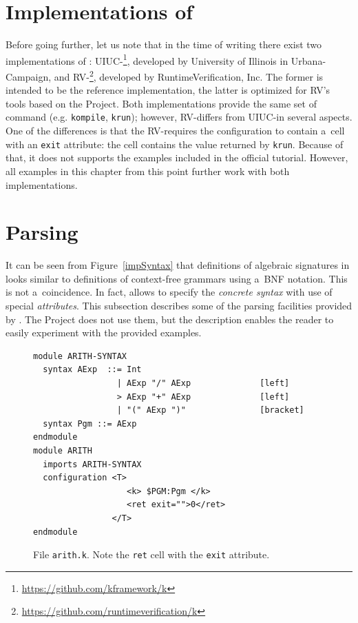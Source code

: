 \documentclass[nolot,nolof,nocover,printed]{fithesis3}
\newcommand{\krun}{\texttt{krun}\xspace}
\newcommand{\kompile}{\texttt{kompile}\xspace}
\newcommand{\Project}{Project\xspace}
\begin{document}

\section{Implementations of \K}

Before going further, let us note that in the time of writing there exist two implementations of \K: UIUC-\K\footnote{\url{https://github.com/kframework/k}}, developed by University of Illinois in Urbana-Campaign, and RV-\K\footnote{\url{https://github.com/runtimeverification/k}}, developed by RuntimeVerification, Inc. The former is intended to be the reference implementation, the latter is optimized for RV's tools based on the Project. Both implementations provide the same set of command (e.g. \kompile, \krun); however, RV-\K differs from UIUC-\K in several aspects. One of the differences is that the RV-\K requires the configuration to contain a~cell with an \texttt{exit} attribute: the cell contains the value returned by \krun. Because of that, it does not supports the examples included in the official \K tutorial. However, all examples in this chapter from this point further work with both implementations.

\section{Parsing}
It can be seen from Figure~\ref{impSyntax} that definitions of algebraic signatures in \K looks similar to definitions of context-free grammars using a~BNF notation. This is not a~coincidence. In fact, \K allows to specify the \textit{concrete syntax} with use of special \textit{attributes}. This subsection describes some of the parsing facilities provided by \K. The \Project does not use them, but the description enables the reader to easily experiment with the provided examples.

\begin{figure}
\begin{lstlisting}
module ARITH-SYNTAX
  syntax AExp  ::= Int
                 | AExp "/" AExp              [left]
                 > AExp "+" AExp              [left]
                 | "(" AExp ")"               [bracket]
  syntax Pgm ::= AExp
endmodule
module ARITH
  imports ARITH-SYNTAX  
  configuration <T>
                   <k> $PGM:Pgm </k>
                   <ret exit="">0</ret>
                </T>
endmodule
\end{lstlisting}
\caption{File \texttt{arith.k}. Note the \texttt{ret} cell with the \texttt{exit} attribute.}
\label{arithSource}
\end{figure}
\end{document}
